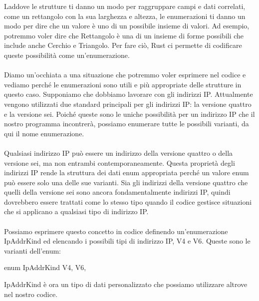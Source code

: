 \documentclass[11pt,a4paper]{article}
\begin{document}
Laddove le strutture ti danno un modo per raggruppare campi e dati correlati, come un rettangolo con la sua larghezza e altezza, le enumerazioni ti danno un modo per dire che un valore è uno di un possibile insieme di valori. Ad esempio, potremmo voler dire che Rettangolo è una di un insieme di forme possibili che include anche Cerchio e Triangolo. Per fare ciò, Rust ci permette di codificare queste possibilità come un'enumerazione.\\
\\
Diamo un'occhiata a una situazione che potremmo voler esprimere nel codice e vediamo perché le enumerazioni sono utili e più appropriate delle strutture in questo caso. Supponiamo che dobbiamo lavorare con gli indirizzi IP. Attualmente vengono utilizzati due standard principali per gli indirizzi IP: la versione quattro e la versione sei. Poiché queste sono le uniche possibilità per un indirizzo IP che il nostro programma incontrerà, possiamo enumerare tutte le possibili varianti, da qui il nome enumerazione.\\
\\
Qualsiasi indirizzo IP può essere un indirizzo della versione quattro o della versione sei, ma non entrambi contemporaneamente. Questa proprietà degli indirizzi IP rende la struttura dei dati enum appropriata perché un valore enum può essere solo una delle sue varianti. Sia gli indirizzi della versione quattro che quelli della versione sei sono ancora fondamentalmente indirizzi IP, quindi dovrebbero essere trattati come lo stesso tipo quando il codice gestisce situazioni che si applicano a qualsiasi tipo di indirizzo IP.\\
\\
Possiamo esprimere questo concetto in codice definendo un'enumerazione IpAddrKind ed elencando i possibili tipi di indirizzo IP, V4 e V6. Queste sono le varianti dell'enum:
\begin{rust}
enum IpAddrKind {
    V4,
    V6,
}
\end{rust}

IpAddrKind è ora un tipo di dati personalizzato che possiamo utilizzare altrove nel nostro codice.
\end{document}

